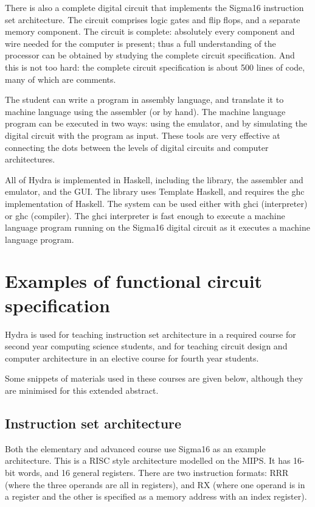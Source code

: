 \documentclass[submission,copyright,creativecommons]{eptcs}
\begin{document}
There is also a complete digital circuit that implements the
Sigma16 instruction set architecture.  The circuit comprises logic
gates and flip flops, and a separate memory component.  The circuit
is complete: absolutely every component and wire needed for the
computer is present; thus a full understanding of the processor can
be obtained by studying the complete circuit specification.  And
this is not too hard: the complete circuit specification is about
500 lines of code, many of which are comments.

The student can write a program in assembly language, and translate
it to machine language using the assembler (or by hand).  The
machine language program can be executed in two ways: using the
emulator, and by simulating the digital circuit with the program as
input.  These tools are very effective at connecting the dots
between the levels of digital circuits and computer architectures.

All of Hydra is implemented in Haskell, including the library, the
assembler and emulator, and the GUI.  The library uses Template
Haskell, and requires the ghc implementation of Haskell.  The system
can be used either with ghci (interpreter) or ghc (compiler).  The
ghci interpreter is fast enough to execute a machine language program
running on the Sigma16 digital circuit as it executes a machine
language program.

\section{Examples of functional circuit specification}
\label{sec:examples}

Hydra is used for teaching instruction set architecture in a
required course for second year computing science students, and for
teaching circuit design and computer architecture in an elective
course for fourth year students.

Some snippets of materials used in these courses are given below,
although they are minimised for this extended abstract.

\subsection{Instruction set architecture}
\label{sec:isa-sigma16}

Both the elementary and advanced course use Sigma16 as an example
architecture.  This is a RISC style architecture modelled on the
MIPS.  It has 16-bit words, and 16 general registers.  There are
two instruction formats: RRR (where the three operands are all in
registers), and RX (where one operand is in a register and the
other is specified as a memory address with an index register).
\end{document}

